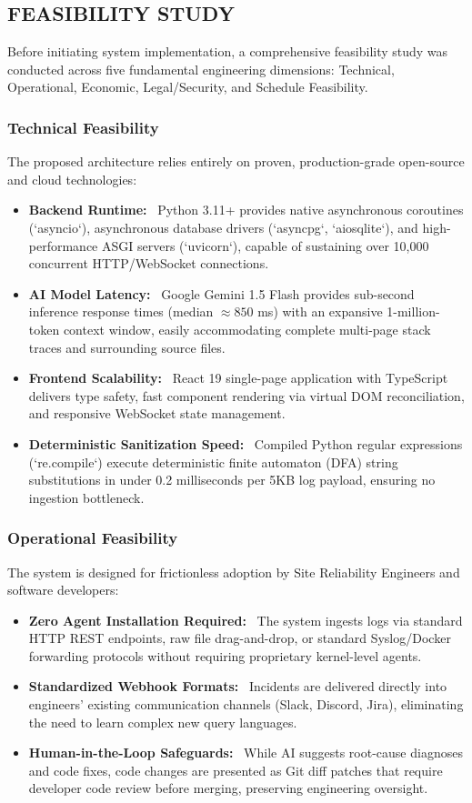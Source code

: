 \documentclass[12pt,a4paper]{article}
\newcommand{\lead}[1]{\textbf{#1}\ }
\begin{document}
\clearpage
\subsection{FEASIBILITY STUDY}
Before initiating system implementation, a comprehensive feasibility study was conducted across five fundamental engineering dimensions: Technical, Operational, Economic, Legal/Security, and Schedule Feasibility.

\subsubsection{Technical Feasibility}
The proposed architecture relies entirely on proven, production-grade open-source and cloud technologies:
\begin{itemize}[leftmargin=1.2em,itemsep=3pt]
    \item \lead{Backend Runtime:} Python 3.11+ provides native asynchronous coroutines (`asyncio`), asynchronous database drivers (`asyncpg`, `aiosqlite`), and high-performance ASGI servers (`uvicorn`), capable of sustaining over 10,000 concurrent HTTP/WebSocket connections.
    \item \lead{AI Model Latency:} Google Gemini 1.5 Flash provides sub-second inference response times (median $\approx 850$ ms) with an expansive 1-million-token context window, easily accommodating complete multi-page stack traces and surrounding source files.
    \item \lead{Frontend Scalability:} React 19 single-page application with TypeScript delivers type safety, fast component rendering via virtual DOM reconciliation, and responsive WebSocket state management.
    \item \lead{Deterministic Sanitization Speed:} Compiled Python regular expressions (`re.compile`) execute deterministic finite automaton (DFA) string substitutions in under 0.2 milliseconds per 5KB log payload, ensuring no ingestion bottleneck.
\end{itemize}

\subsubsection{Operational Feasibility}
The system is designed for frictionless adoption by Site Reliability Engineers and software developers:
\begin{itemize}[leftmargin=1.2em,itemsep=3pt]
    \item \lead{Zero Agent Installation Required:} The system ingests logs via standard HTTP REST endpoints, raw file drag-and-drop, or standard Syslog/Docker forwarding protocols without requiring proprietary kernel-level agents.
    \item \lead{Standardized Webhook Formats:} Incidents are delivered directly into engineers' existing communication channels (Slack, Discord, Jira), eliminating the need to learn complex new query languages.
    \item \lead{Human-in-the-Loop Safeguards:} While AI suggests root-cause diagnoses and code fixes, code changes are presented as Git diff patches that require developer code review before merging, preserving engineering oversight.
\end{itemize}
\end{document}
